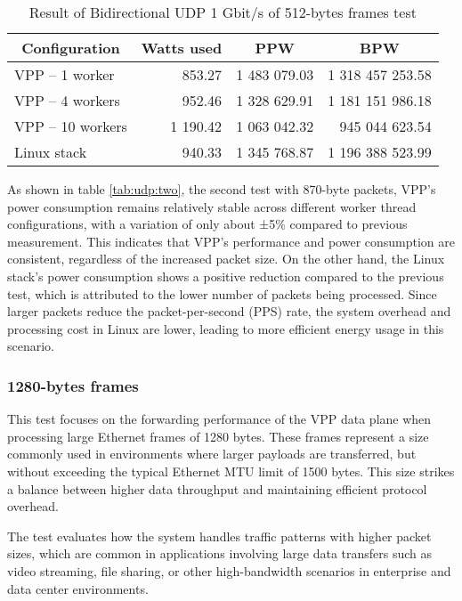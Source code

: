 \begin{table}[h!]
\centering
\begin{tabular}{|l|r|r|r|}
\hline
\multicolumn{1}{|c|}{\textbf{Configuration}} &
\multicolumn{1}{c|}{\textbf{Watts used}} &
\multicolumn{1}{c|}{\textbf{PPW}} &
\multicolumn{1}{c|}{\textbf{BPW}} \\
\hline
VPP -- 1 worker & 853.27 & 1 483 079.03 & 1 318 457 253.58 \\
VPP -- 4 workers & 952.46 & 1 328 629.91 & 1 181 151 986.18 \\
VPP -- 10 workers & 1 190.42 & 1 063 042.32 & 945 044 623.54 \\
Linux stack & 940.33 & 1 345 768.87 & 1 196 388 523.99 \\
\hline
\end{tabular}
\caption{Result of Bidirectional UDP 1 Gbit/s of 512-bytes frames test}
\label{tab:udp:three}
\end{table}

As shown in table \ref{tab:udp:two}, the second test with 870-byte packets, 
VPP's power consumption remains relatively stable across different worker thread configurations, with a variation of only about ±5\% compared to previous measurement. 
This indicates that VPP's performance and power consumption are consistent, regardless of the increased packet size. 
On the other hand, the Linux stack's power consumption shows a positive reduction compared to the previous test, which is attributed to the lower number of packets being processed. 
Since larger packets reduce the packet-per-second (PPS) rate, the system overhead and processing cost in Linux are lower, leading to more efficient energy usage in this scenario.

\subsubsection{1280-bytes frames}
This test focuses on the forwarding performance of the VPP data plane when processing large Ethernet frames of 1280 bytes. 
These frames represent a size commonly used in environments where larger payloads are transferred, but without exceeding the typical Ethernet MTU limit of 1500 bytes. 
This size strikes a balance between higher data throughput and maintaining efficient protocol overhead.

The test evaluates how the system handles traffic patterns with higher packet sizes, which are common in applications involving large data transfers such as video streaming, 
file sharing, or other high-bandwidth scenarios in enterprise and data center environments.


